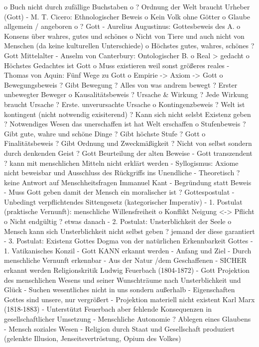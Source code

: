 \documentclass[11pt, paper=a4, twocolumn]{scrartcl}
\begin{document}
o	Buch nicht durch zufällige Buchstaben
o	? Ordnung der Welt braucht Urheber (Gott)
-	M. T. Cicero: Ethnologischer Beweis
o	Kein Volk ohne Götter
o	Glaube allgemein / angeboren
o	? Gott
-	Aurelius Augustinus: Gottesbeweis des A.
o	Konsens über wahres, gutes und schönes
o	Nicht von Tiere und auch nicht von Menschen (da keine kulturellen Unterschiede)
o	Höchstes gutes, wahres, schönes ? Gott
Mittelalter
-	Anselm von Canterbury: Ontologischer B.
o	Real > gedacht
o	Höchstes Gedachtes ist Gott
o	Muss existieren weil sonst größeres reales
-	Thomas von Aquin: Fünf Wege zu Gott
o	Empirie -> Axiom -> Gott
o	Bewegungsbeweis
?	Gibt Bewegung
?	Alles von was andrem bewegt
?	Erster unbewegter Beweger
o	Kausalitätsbeweis
?	Ursache & Wirkung
?	Jede Wirkung braucht Ursache
?	Erste. unverursachte Ursache
o	Kontingenzbeweis
?	Welt ist kontingent (nicht notwendig exisiterend)
?	Kann sich nicht selsbt Existenz geben
?	Notwendiges Wesen das unerschaffen ist hat Welt erschaffen
o	Stufenbeweis
?	Gibt gute, wahre und schöne Dinge
?	Gibt höchste Stufe
?	Gott
o	Finalitätsbeweis
?	Gibt Ordnung und Zweckmäßigkeit
?	Nicht von selbst sondern durch denkenden Geist
?	Gott
Beurteilung der alten Beweise
-	Gott transzendent ? kann mit menschlichen Mitteln nicht erklärt werden
-	Syllogismus: Axiome nicht beweisbar und Ausschluss des Rückgriffs ins Unendliche
-	Theoretisch ? keine Antwort auf Menschheitsfragen
Immanuel Kant
-	Begründung statt Beweis
-	Muss Gott geben damit der Mensch ein moralischer ist
? Gottespostulat
-	Unbedingt verpflichtendes Sittengesetz (kategorischer Imperativ)
-	1. Postulat (praktische Vernunft): menschliche Willensfreiheit
o	Konflikt Neigung <-> Pflicht
o	Nicht endgültig ? etwas danach
-	2. Postulat: Unsterblichkeit der Seele
o	Mensch kann sich Unsterblichkeit nicht selbst geben ? jemand der diese garantiert
-	3. Postulat: Existenz Gottes
Dogma von der natürlichen Erkennbarkeit Gottes
-	1. Vatikanisches Konzil
-	Gott KANN erkannt werden
-	Anfang und Ziel
-	Durch menschliche Vernunft erkennbar
-	Aus der Natur /dem Geschaffenen
-	SICHER erkannt werden
Religionskritik
Ludwig Feuerbach (1804-1872)
-	Gott Projektion des menschlichen Wesens und seiner Wunschträume nach Unsterblichkeit und Glück
-	Suchen wesentliches nicht in uns sondern außerhalb
-	Eigenschaften Gottes sind unsere, nur vergrößert
-	Projektion materiell nicht existent
Karl Marx (1818-1883)
-	Unterstützt Feuerbach aber fehlende Konsequenzen in gesellschaftlicher Umsetzung
-	Menschliche Autonomie ? Ablegen eines Glaubens
-	Mensch soziales Wesen
-	Religion durch Staat und Gesellschaft produziert (gelenkte Illusion, Jenseitsvertröstung, Opium des Volkes)
\end{document}

